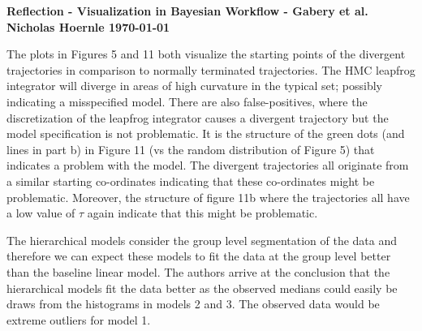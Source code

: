\documentclass[twoside]{article}
\begin{document}
\textbf{Reflection - Visualization in Bayesian Workflow - Gabery et al.}\\
\textbf{Nicholas Hoernle \hfill \today}

The plots in Figures 5 and 11 both visualize the starting points of the divergent trajectories in comparison to normally terminated trajectories. The HMC leapfrog integrator will diverge in areas of high curvature in the typical set; possibly indicating a misspecified model. There are also false-positives, where the discretization of the leapfrog integrator causes a divergent trajectory but the model specification is not problematic. It is the structure of the green dots (and lines in part b) in Figure 11 (vs the random distribution of Figure 5) that indicates a problem with the model. The divergent trajectories all originate from a similar starting co-ordinates indicating that these co-ordinates might be problematic. Moreover, the structure of figure 11b where the trajectories all have a low value of $\tau$ again indicate that this might be problematic.

The hierarchical models consider the group level segmentation of the data and therefore we can expect these models to fit the data at the group level better than the baseline linear model. The authors arrive at the conclusion that the hierarchical models fit the data better as the observed medians could easily be draws from the histograms in models 2 and 3. The observed data would be extreme outliers for model 1.
\end{document}
